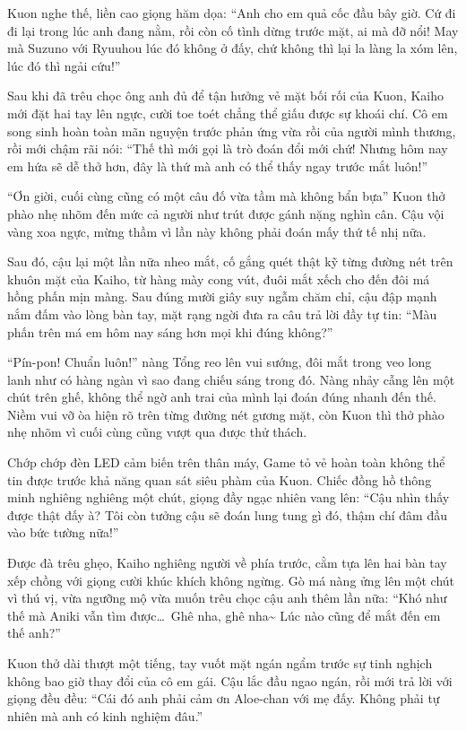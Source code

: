 \documentclass[../main.tex]{subfiles}
\begin{document}
Kuon nghe thế, liền cao giọng hăm dọa: ``Anh cho em quả cốc đầu bây giờ. Cứ đi đi lại trong lúc anh đang nằm, rồi còn cố tình dừng trước mặt, ai mà đỡ nổi! May mà Suzuno với Ryuuhou lúc đó không ở đấy, chứ không thì lại la làng la xóm lên, lúc đó thì ngải cứu!''

Sau khi đã trêu chọc ông anh đủ để tận hưởng vẻ mặt bối rối của Kuon, Kaiho mới đặt hai tay lên ngực, cười toe toét chẳng thể giấu được sự khoái chí. Cô em song sinh hoàn toàn mãn nguyện trước phản ứng vừa rồi của người mình thương, rồi mới chậm rãi nói: ``Thế thì mới gọi là trò đoán đổi mới chứ! Nhưng hôm nay em hứa sẽ dễ thở hơn, đây là thứ mà anh có thể thấy ngay trước mắt luôn!''

``Ơn giời, cuối cùng cũng có một câu đố vừa tầm mà không bẩn bựa'' Kuon thở phào nhẹ nhõm đến mức cả người như trút được gánh nặng nghìn cân. Cậu vội vàng xoa ngực, mừng thầm vì lần này không phải đoán mấy thứ tế nhị nữa.

Sau đó, cậu lại một lần nữa nheo mắt, cố gắng quét thật kỹ từng đường nét trên khuôn mặt của Kaiho, từ hàng mày cong vút, đuôi mắt xếch cho đến đôi má hồng phấn mịn màng. Sau đúng mười giây suy ngẫm chăm chỉ, cậu đập mạnh nắm đấm vào lòng bàn tay, mặt rạng ngời đưa ra câu trả lời đầy tự tin: ``Màu phấn trên má em hôm nay sáng hơn mọi khi đúng không?''

``Pín-pon! Chuẩn luôn!'' nàng Tổng reo lên vui sướng, đôi mắt trong veo long lanh như có hàng ngàn vì sao đang chiếu sáng trong đó. Nàng nhảy cẫng lên một chút trên ghế, không thể ngờ anh trai của mình lại đoán đúng nhanh đến thế. Niềm vui vỡ òa hiện rõ trên từng đường nét gương mặt, còn Kuon thì thở phào nhẹ nhõm vì cuối cùng cũng vượt qua được thử thách.

Chớp chớp đèn LED cảm biến trên thân máy, Game tỏ vẻ hoàn toàn không thể tin được trước khả năng quan sát siêu phàm của Kuon. Chiếc đồng hồ thông minh nghiêng nghiêng một chút, giọng đầy ngạc nhiên vang lên: ``Cậu nhìn thấy được thật đấy à? Tôi còn tưởng cậu sẽ đoán lung tung gì đó, thậm chí đâm đầu vào bức tường nữa!''

Được đà trêu ghẹo, Kaiho nghiêng người về phía trước, cằm tựa lên hai bàn tay xếp chồng với giọng cười khúc khích không ngừng. Gò má nàng ửng lên một chút vì thú vị, vừa ngưỡng mộ vừa muốn trêu chọc cậu anh thêm lần nữa: ``Khó như thế mà Aniki vẫn tìm được\dots\ Ghê nha, ghê nha\~{} Lúc nào cũng để mắt đến em thế anh?''

Kuon thở dài thượt một tiếng, tay vuốt mặt ngán ngẩm trước sự tinh nghịch không bao giờ thay đổi của cô em gái. Cậu lắc đầu ngao ngán, rồi mới trả lời với giọng đều đều: ``Cái đó anh phải cảm ơn Aloe-chan với mẹ đấy. Không phải tự nhiên mà anh có kinh nghiệm đâu.''
\end{document}

